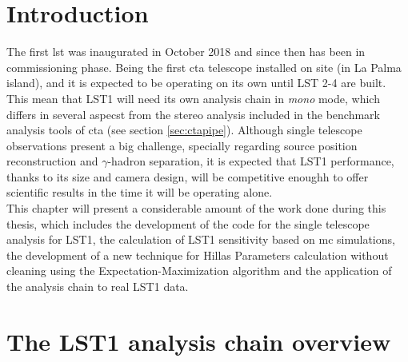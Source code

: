 \documentclass[main.tex]{subfiles}
\begin{document}
\glsresetall

\section{Introduction}

The first \gls{lst} was inaugurated in October 2018 and since then has been in commissioning phase. Being the first \gls{cta} telescope installed on site (in La Palma island), and it is expected to be operating on its own until LST 2-4 are built. This mean that LST1 will need its own analysis chain in \textit{mono} mode, which differs in several aspecst from the stereo analysis included in the benchmark analysis tools of \gls{cta} (see section \ref{sec:ctapipe}). Although single telescope observations present a big challenge, specially regarding source position reconstruction and $\gamma$-hadron separation, it is expected that LST1 performance, thanks to its size and camera design, will be competitive enoughh to offer scientific results in the time it will be operating alone.\\
This chapter will present a considerable amount of the work done during this thesis, which includes the development of the code for the single telescope analysis for LST1, the calculation of LST1 sensitivity based on \gls{mc} simulations, the development of a new technique for Hillas Parameters calculation without cleaning using the Expectation-Maximization algorithm and the application of the analysis chain to real LST1 data. 

\section{The LST1 analysis chain overview} \label{sec:anachain}
\end{document}
